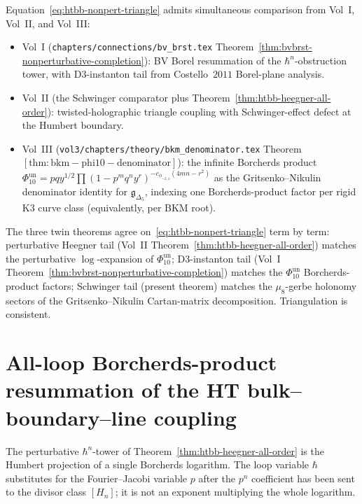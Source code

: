 \begin{remark}
\label{rem:htbb-nonpert-cross-volume}
Equation~\eqref{eq:htbb-nonpert-triangle} admits simultaneous
comparison from Vol~I, Vol~II, and Vol~III:
\begin{itemize}[leftmargin=1.8em]
\item Vol~I (\texttt{chapters/connections/bv\_brst.tex}
Theorem~\ref{thm:bvbrst-nonperturbative-completion}): BV Borel
resummation of the $\hbar^n$-obstruction tower, with
D$3$-instanton tail from Costello~$2011$ Borel-plane analysis.
\item Vol~II (the Schwinger comparator plus
Theorem~\ref{thm:htbb-heegner-all-order}): twisted-holographic
triangle coupling with Schwinger-effect defect at the Humbert
boundary.
\item Vol~III (\texttt{vol3/chapters/theory/bkm\_denominator.tex}
Theorem~$\mathrm{[thm:bkm-phi10-denominator]}$): the infinite
Borcherds product
$\Phi_{10}^{\mathrm{un}} = pqy^{1/2}\prod(1-p^mq^ny^r)^{-c_{\phi_{-2,1}}(4mn-r^2)}$
as the Gritsenko--Nikulin denominator identity for
$\mathfrak{g}_{\Delta_5}$, indexing one Borcherds-product factor per
rigid K$3$ curve class (equivalently, per BKM root).
\end{itemize}
The three twin theorems agree on~\eqref{eq:htbb-nonpert-triangle}
term by term: perturbative Heegner tail (Vol~II
Theorem~\ref{thm:htbb-heegner-all-order}) matches the perturbative
$\log$-expansion of $\Phi_{10}^{\mathrm{un}}$; D$3$-instanton tail (Vol~I
Theorem~\ref{thm:bvbrst-nonperturbative-completion}) matches the
$\Phi_{10}^{\mathrm{un}}$ Borcherds-product factors; Schwinger tail (present
theorem) matches the $\mu_8$-gerbe holonomy sectors of the
Gritsenko--Nikulin Cartan-matrix decomposition. Triangulation is
consistent.
\end{remark}

\section{All-loop Borcherds-product resummation of the HT
bulk--boundary--line coupling}
\label{sec:htbb-allloop-resummation}

The perturbative $\hbar^n$-tower of
Theorem~\ref{thm:htbb-heegner-all-order} is the Humbert projection of a
single Borcherds logarithm. The loop variable $\hbar$ substitutes for
the Fourier--Jacobi variable $p$ after the $p^n$ coefficient has been
sent to the divisor class $[H_n]$; it is not an exponent multiplying
the whole logarithm.

